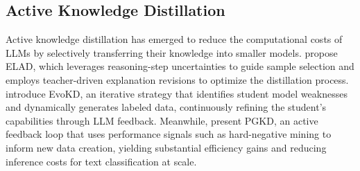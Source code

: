 











\subsection{Active Knowledge Distillation}
Active knowledge distillation has emerged to reduce the computational costs of LLMs by selectively transferring their knowledge into smaller models. 
\citet{zhang2024elad} propose ELAD, which leverages reasoning-step uncertainties to guide sample selection and employs teacher-driven explanation revisions to optimize the distillation process. 
\citet{liu-etal-2024-evolving} introduce EvoKD, an iterative strategy that identifies student model weaknesses and dynamically generates labeled data, continuously refining the student’s capabilities through LLM feedback. 
Meanwhile, \citet{palo-etal-2024-performance} present PGKD, an active feedback loop that uses performance signals such as hard-negative mining to inform new data creation, yielding substantial efficiency gains and reducing inference costs for text classification at scale.


